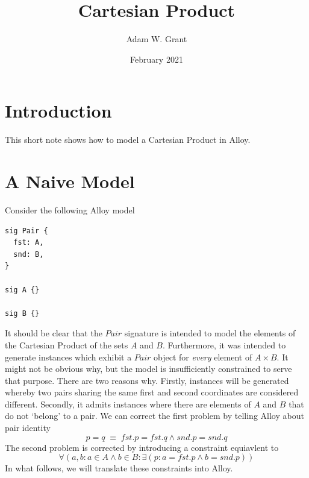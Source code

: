 \documentclass{article}
\title{Cartesian Product}
\author{Adam W. Grant}
\date{February 2021}
\begin{document}
\maketitle

\section{Introduction}
This short note shows how to model a Cartesian Product in Alloy.

\section{A Naive Model}
Consider the following Alloy model
\begin{verbatim}
sig Pair {
  fst: A,
  snd: B,
}

sig A {}

sig B {}
\end{verbatim}
It should be clear that the $Pair$ signature is intended to model the elements of the Cartesian Product of the sets $A$ and $B$.  Furthermore, it was intended to generate instances which exhibit a $Pair$ object for \emph{every} element of $A \times B$.  It might not be obvious why, but the model is insufficiently constrained to serve that purpose.  There are two reasons why.  Firstly, instances will be generated whereby two pairs sharing the same first and second coordinates are considered different.  Secondly, it admits instances where there are elements of $A$ and $B$ that do not `belong' to a pair.
We can correct the first problem by telling Alloy about pair identity
\begin{equation}
    p = q \;\equiv\; fst.p = fst.q \wedge snd.p = snd.q
\end{equation}
The second problem is corrected by introducing a constraint equiavlent to
\begin{equation}
    \forall ( a,b : a \in A \wedge b \in B : \exists( p : a = fst.p \wedge b = snd.p ) )
\end{equation}
In what follows, we will translate these constraints into Alloy.
\end{document}
